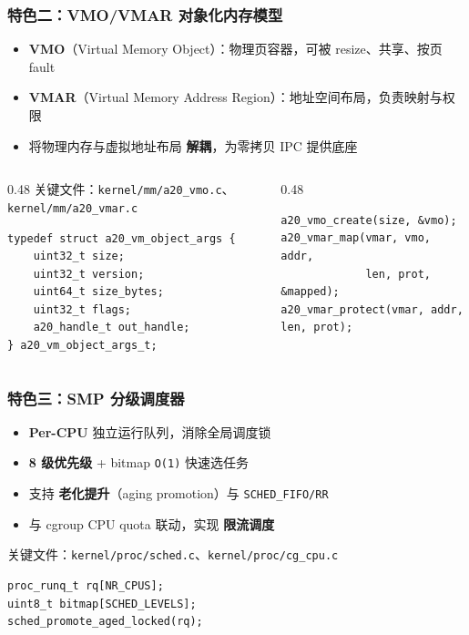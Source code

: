 \documentclass[aspectratio=1610]{beamer}
\newcommand{\code}[1]{\texttt{\footnotesize #1}}
\newcommand{\high}[1]{\textbf{\textcolor{ThemeColor}{#1}}}
\begin{document}
\begin{frame}[fragile]
    \frametitle{特色二：VMO/VMAR 对象化内存模型}
    \begin{itemize}
        \item \high{VMO}（Virtual Memory Object）：物理页容器，可被 resize、共享、按页 fault
        \item \high{VMAR}（Virtual Memory Address Region）：地址空间布局，负责映射与权限
        \item 将物理内存与虚拟地址布局 \high{解耦}，为零拷贝 IPC 提供底座
    \end{itemize}
    \vspace{0.3em}
    \begin{columns}
        \begin{column}{0.48\textwidth}
            \small 关键文件：\code{kernel/mm/a20\_vmo.c}、\code{kernel/mm/a20\_vmar.c}
            \begin{lstlisting}[basicstyle=\ttfamily\tiny]
typedef struct a20_vm_object_args {
    uint32_t size;
    uint32_t version;
    uint64_t size_bytes;
    uint32_t flags;
    a20_handle_t out_handle;
} a20_vm_object_args_t;
            \end{lstlisting}
        \end{column}
        \begin{column}{0.48\textwidth}
            \begin{lstlisting}[basicstyle=\ttfamily\tiny]
a20_vmo_create(size, &vmo);
a20_vmar_map(vmar, vmo, addr,
             len, prot, &mapped);
a20_vmar_protect(vmar, addr, len, prot);
            \end{lstlisting}
        \end{column}
    \end{columns}
\end{frame}

\begin{frame}[fragile]
    \frametitle{特色三：SMP 分级调度器}
    \begin{itemize}
        \item \high{Per-CPU} 独立运行队列，消除全局调度锁
        \item \high{8 级优先级} + bitmap \code{O(1)} 快速选任务
        \item 支持 \high{老化提升}（aging promotion）与 \code{SCHED\_FIFO/RR}
        \item 与 cgroup CPU quota 联动，实现 \high{限流调度}
    \end{itemize}
    \vspace{0.3em}
    \small 关键文件：\code{kernel/proc/sched.c}、\code{kernel/proc/cg\_cpu.c}
    \begin{lstlisting}[basicstyle=\ttfamily\scriptsize]
proc_runq_t rq[NR_CPUS];
uint8_t bitmap[SCHED_LEVELS];
sched_promote_aged_locked(rq);
    \end{lstlisting}
\end{frame}
\end{document}
